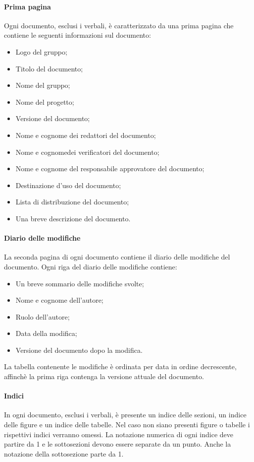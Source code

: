 		\paragraph{Prima pagina}\Spazio
		Ogni documento, esclusi i verbali, è caratterizzato da una prima pagina che contiene le seguenti informazioni sul documento:
		\begin{itemize}
			\item Logo del gruppo;
			\item Titolo del documento;
			\item Nome del gruppo;
			\item Nome del progetto;
			\item Versione del documento;
			\item Nome e cognome dei redattori del documento;
			\item Nome e cognomedei verificatori del documento;
			\item Nome e cognome del responsabile approvatore del documento;
			\item Destinazione d’uso del documento;
			\item Lista di distribuzione del documento;
			\item Una breve descrizione del documento.
		\end{itemize}
	
		\paragraph{Diario delle modifiche} \Spazio
		\label{registroModifiche}
		La seconda pagina di ogni documento contiene il diario delle modifiche del documento.
		Ogni riga del diario delle modifiche contiene:
		\begin{itemize}
			\item Un breve sommario delle modifiche svolte;
			\item Nome e cognome dell’autore;
			\item Ruolo dell’autore;
			\item Data della modifica;
			\item Versione del documento dopo la modifica.
		\end{itemize}
		La tabella contenente le modifiche è ordinata per data in ordine decrescente, affinchè la prima riga contenga la versione attuale del documento.
		
		\paragraph{Indici} \Spazio
		In ogni documento, esclusi i verbali, è presente un indice delle sezioni, un indice delle figure e un indice delle tabelle. Nel caso non siano presenti figure o tabelle i rispettivi indici verranno omessi. La notazione numerica di ogni indice deve partire da 1 e le sottosezioni devono essere separate da un punto. Anche la notazione della sottosezione parte da 1.
		
